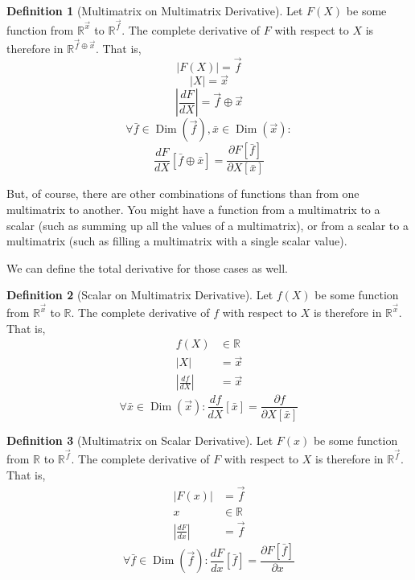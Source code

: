 \documentclass[12pt]{book}
\theoremstyle{definition}
\newtheorem{definition}{Definition}[chapter]
\theoremstyle{plain}
\theoremstyle{ppart}
\theoremstyle{case}
\theoremstyle{solution}
\DeclareMathOperator{\Dim}{Dim}
\begin{document}
\begin{definition}[Multimatrix on Multimatrix Derivative]
\label{mm_derivative}
Let $F(X)$ be some function from $\mathbb{R}^{\vec{x}}$ to $\mathbb{R}^{\vec{f}}$.
The complete derivative of $F$ with respect to $X$ is therefore in
$\mathbb{R}^{\vec{f} \oplus \vec{x}}$. That is,
\[ |F(X)| = \vec{f} \]
\[ |X| = \vec{x} \]
\[ \left|\frac{dF}{dX}\right| = \vec{f} \oplus \vec{x} \]
\[
\forall \bar{f} \in \Dim(\vec{f}),
        \bar{x} \in \Dim(\vec{x}):
\]
\[
\frac{dF}{dX}[\bar{f} \oplus \bar{x}] =
\frac{\partial F[\bar{f}]}{\partial X[\bar{x}]}
\]
\end{definition}

But, of course, there are other combinations of functions than from one
multimatrix to another. You might have a function from a multimatrix to a
scalar (such as summing up all the values of a multimatrix), or from a scalar
to a multimatrix (such as filling a multimatrix with a single scalar value).

We can define the total derivative for those cases as well.

\begin{definition}[Scalar on Multimatrix Derivative]
\label{sm_derivative}
Let $f(X)$ be some function from $\mathbb{R}^{\vec{x}}$ to $\mathbb{R}$.
The complete derivative of $f$ with respect to $X$ is therefore in
$\mathbb{R}^{\vec{x}}$. That is,
\begin{align*}
f(X) &\in \mathbb{R} \\
|X| &= \vec{x} \\
\left|\frac{df}{dX}\right| &= \vec{x}
\end{align*}
\[
\forall \bar{x} \in \Dim(\vec{x}):
        \frac{df}{dX}[\bar{x}] =
        \frac{\partial f}{\partial X[\bar{x}]}
\]
\end{definition}

\begin{definition}[Multimatrix on Scalar Derivative]
\label{ms_derivative}
Let $F(x)$ be some function from $\mathbb{R}$ to $\mathbb{R}^{\vec{f}}$.
The complete derivative of $F$ with respect to $X$ is therefore in
$\mathbb{R}^{\vec{f}}$. That is,
\begin{align*}
|F(x)| &= \vec{f} \\
x &\in \mathbb{R} \\
\left|\frac{dF}{dx}\right| &= \vec{f}
\end{align*}
\[
\forall \bar{f} \in \Dim(\vec{f}):
        \frac{dF}{dx}[\bar{f}] =
        \frac{\partial F[\bar{f}]}{\partial x}
\]
\end{definition}
\end{document}
